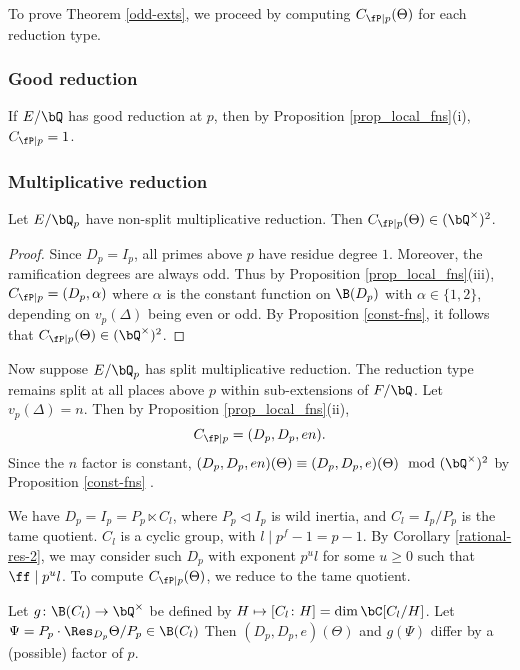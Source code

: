 To prove Theorem \ref{odd-exts}, we proceed by computing $C_{\fP \mid p}(\Theta)$ for each reduction type.

\subsubsection*{Good reduction}
If $E / \bQ$ has good reduction at $p$, then by Proposition \ref{prop_local_fns}(i), $C_{\fP \mid p} = 1$.

\subsubsection*{Multiplicative reduction}

\begin{lemma}
Let $E / \bQ_p$ have non-split multiplicative reduction. Then $C_{\fP \mid p}(\Theta) \in (\bQ^{\times})^2$.
\end{lemma}

\begin{proof}
Since $D_p = I_p$, all primes above $p$ have residue degree $1$. Moreover, the ramification degrees are always odd. Thus by Proposition \ref{prop_local_fns}(iii), $C_{\fP \mid p}  = (D_p, \alpha)$
where $\alpha$ is the constant function on $\B(D_p)$ with $\alpha \in \{1, 2\}$, depending on $v_p(\Delta)$ being even or odd. By Proposition \ref{const-fns}, it follows that $C_{\fP \mid p}(\Theta) \in (\bQ^{\times})^2$.
\end{proof}

Now suppose $E / \bQ_p$ has split multiplicative reduction. The reduction type remains split at all places above $p$ within sub-extensions of $F / \bQ$. Let $v_p(\Delta) = n$. Then by Proposition \ref{prop_local_fns}(ii), 
\[ C_{\fP \mid p} = (D_p, D_p, en). \]
Since the $n$ factor is constant, $(D_p, D_p, en)(\Theta) \equiv (D_p, D_p, e)(\Theta) \mod (\bQ^{\times}) ^2$ by Proposition \ref{const-fns} .

We have $D_p = I_p = P_p \ltimes C_l$, where $P_p \triangleleft I_p$ is wild inertia, and $C_l = I_p / P_p$ is the tame quotient. $C_l$ is a cyclic group, with $l \mid p^f - 1 = p - 1$. By Corollary \ref{rational-res-2}, we may consider such $D_p$ with exponent  $p^u l$ for some $u \geq 0$ such that $\ff \mid p^u l$. To compute $C_{\fP \mid p}(\Theta)$, we reduce to the tame quotient.

\begin{lemma}
Let $g \colon \B(C_l) \to \bQ^{\times}$ be defined by $H \mapsto [C_l \colon H] = \dim \bC[C_l / H]$. Let $\Psi = P_p \cdot \Res_{D_p} \Theta / P_p \in \B(C_l)$ Then $(D_p, D_p, e)(\Theta)$ and $g(\Psi)$ differ by a (possible) factor of $p$. 
\end{lemma}

